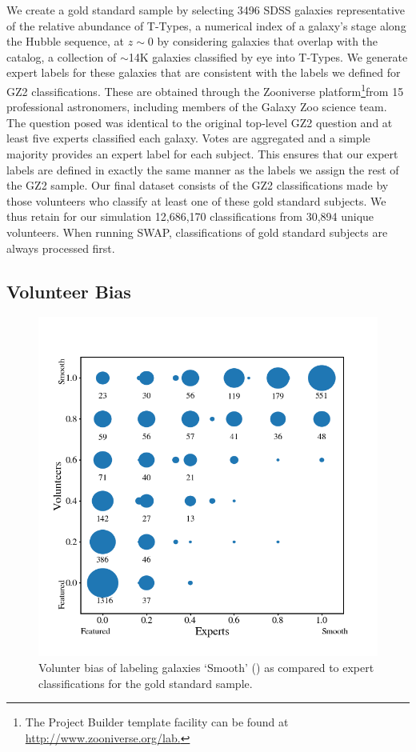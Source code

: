 We create a gold standard sample by selecting 3496 SDSS galaxies representative of the relative abundance of T-Types, a numerical index of a galaxy's stage along the Hubble sequence, at $z\sim0$ by considering galaxies that overlap with the~\cite{NairAbraham2010} catalog, a collection of $\sim$14K galaxies classified by eye into T-Types. We generate expert labels for these galaxies that are consistent with the labels we defined for GZ2 classifications. These are obtained through the Zooniverse platform\footnote{The Project Builder template facility can be found at \url{http://www.zooniverse.org/lab.}}from 15 professional astronomers, including members of the Galaxy Zoo science team.  The question posed was identical to the original top-level GZ2 question and at least five experts classified each galaxy. Votes are aggregated and a simple majority provides an expert label for each subject. This ensures that our expert labels are defined in exactly the same manner as the labels we assign the rest of the GZ2 sample. Our final dataset consists of the GZ2 classifications made by those volunteers who classify at least one of these gold standard subjects. We thus retain for our simulation 12,686,170 classifications from 30,894 unique volunteers. When running SWAP, classifications of gold standard subjects are always processed first. 



\subsection{Volunteer Bias}\label{chap3: bias}

\begin{figure}
\centering
\includegraphics[width=5in]{Figures/expert_vs_volunteer_votes_highskill_11-6-17.png}
\caption[Potential bias between Expert and Volunteer visual classifications.]{Volunter bias of labeling galaxies `Smooth' (\notfeat) as compared to expert classifications for the gold standard sample.}
\label{fig: volunteer bias}
\end{figure}

